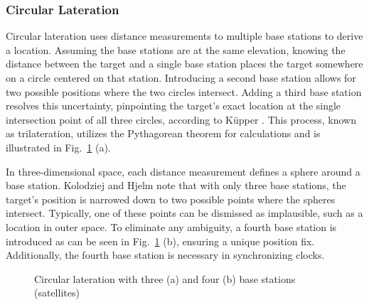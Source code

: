 \subsubsection{Circular Lateration}
Circular lateration uses distance measurements to multiple base stations to derive a location. 
Assuming the base stations are at the same elevation, knowing the distance between the target and a single base station places the target somewhere on a circle centered on that station. 
Introducing a second base station allows for two possible positions where the two circles intersect. 
Adding a third base station resolves this uncertainty, pinpointing the target's exact location at the single intersection point of all three circles, according to K\"upper \cite{kupper2005location}. 
This process, known as trilateration, utilizes the Pythagorean theorem for calculations and is illustrated in Fig.~\ref{fig:circular_lateration} (a).

In three-dimensional space, each distance measurement defines a sphere around a base station. 
Kolodziej and Hjelm \cite{kolodziej2017local} note that with only three base stations, the target's position is narrowed down to two possible points where the spheres intersect. 
Typically, one of these points can be dismissed as implausible, such as a location in outer space. 
To eliminate any ambiguity, a fourth base station is introduced as can be seen in Fig.~\ref{fig:circular_lateration} (b), ensuring a unique position fix. Additionally, the fourth base station is necessary in synchronizing clocks.

\begin{figure}[htbp]%
    \centering
    \qquad
    \caption{Circular lateration with three (a) and four (b) base stations (satellites) \cite{gisgeography_trilateration}}%
    \label{fig:circular_lateration}%
\end{figure}

